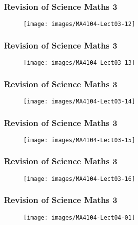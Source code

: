 \documentclass{beamer}
\begin{document}
	\begin{frame}
		\frametitle{Revision of Science Maths 3}
		\begin{figure}
			\centering
			\texttt{[image: images/MA4104-Lect03-12]}
			
		\end{figure}
	\end{frame}
	\begin{frame}
		\frametitle{Revision of Science Maths 3}
		\begin{figure}
			\centering
			\texttt{[image: images/MA4104-Lect03-13]}
			
		\end{figure}
	\end{frame}
	\begin{frame}
		\frametitle{Revision of Science Maths 3}
		\begin{figure}
			\centering	
			\texttt{[image: images/MA4104-Lect03-14]}
			
		\end{figure}
	\end{frame}
	\begin{frame}
		\frametitle{Revision of Science Maths 3}
		\begin{figure}
			\centering
			\texttt{[image: images/MA4104-Lect03-15]}
			
		\end{figure}
	\end{frame}
	\begin{frame}
		\frametitle{Revision of Science Maths 3}
		\begin{figure}
			\centering
			\texttt{[image: images/MA4104-Lect03-16]}
			
		\end{figure}
	\end{frame}
	\begin{frame}
		\frametitle{Revision of Science Maths 3}
		\begin{figure}
			\centering
			\texttt{[image: images/MA4104-Lect04-01]}
			
		\end{figure}
	\end{frame}
\end{document}

